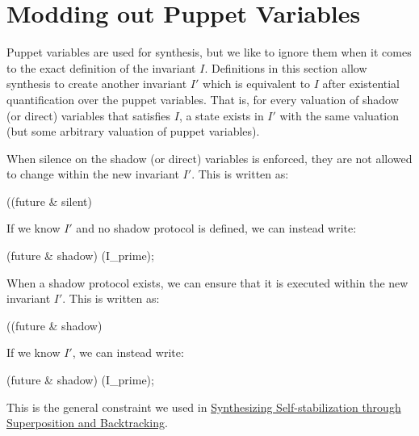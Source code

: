 \section{Modding out Puppet Variables}

Puppet variables are used for synthesis, but we like to ignore them when it comes to the exact definition of the invariant $I$.
Definitions in this section allow synthesis to create another invariant $I'$ which is equivalent to $I$ after existential quantification over the puppet variables.
That is, for every valuation of shadow (or direct) variables that satisfies $I$, a state exists in $I'$ with the same valuation (but some arbitrary valuation of puppet variables).

When silence on the shadow (or direct) variables is enforced, they are not allowed to change within the new invariant $I'$.
This is written as:
\begin{code}
((future & silent) %
\end{code}
If we know $I'$ and no shadow protocol is defined, we can instead write:
\begin{code}
(future & shadow) (I_prime);
\end{code}

When a shadow protocol exists, we can ensure that it is executed within the new invariant $I'$.
This is written as:
\begin{code}
((future & shadow) %
\end{code}
If we know $I'$, we can instead write:
\begin{code}
(future & shadow) (I_prime);
\end{code}
This is the general constraint we used in \href{http://dx.doi.org/10.1007/978-3-319-11764-5_18}{Synthesizing Self-stabilization through Superposition and Backtracking}.

